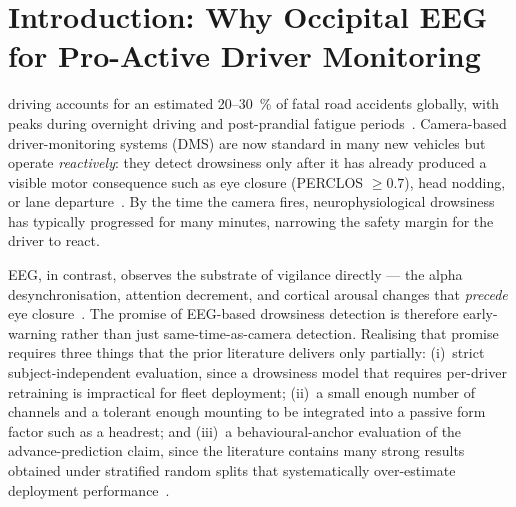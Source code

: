 \documentclass[journal]{IEEEtran}
\DeclareRobustCommand{\add}[1]{#1}                         %
\DeclareRobustCommand{\del}[1]{}                           %
\DeclareRobustCommand{\add}[1]{\hl{#1}}
\DeclareRobustCommand{\del}[1]{{\color{delred}\sout{#1}}\,}
\DeclareRobustCommand{\del}[1]{}                         %
\DeclareRobustCommand{\chg}[2]{\del{#1}\add{#2}}
\begin{document}
\section{\chg{Introduction}{Introduction: Why Occipital EEG for Pro-Active Driver Monitoring}}
\label{sec:intro}
 driving accounts for an estimated 20--30~\% of fatal road accidents globally, with peaks during overnight driving and post-prandial fatigue periods~\cite{who2023road}. Camera-based driver-monitoring systems (DMS) are now standard in many new vehicles but operate \emph{reactively}: they detect drowsiness only after it has already produced a visible motor consequence such as eye closure (PERCLOS \(\geq 0.7\)), head nodding, or lane departure~\cite{seeingmachines2024}. By the time the camera fires, neurophysiological drowsiness has typically progressed for many minutes, narrowing the safety margin for the driver to react.

EEG, in contrast, observes the substrate of vigilance directly --- the alpha desynchronisation, attention decrement, and cortical arousal changes that \emph{precede} eye closure~\cite{jap2009eeg,stancin2021review}. The promise of EEG-based drowsiness detection is therefore early-warning rather than just same-time-as-camera detection. Realising that promise requires three things that the prior literature delivers only partially: (i)~strict subject-independent evaluation, since a drowsiness model that requires per-driver retraining is impractical for fleet deployment; (ii)~a small enough number of channels and a tolerant enough mounting to be integrated into a passive form factor such as a headrest; and (iii)~a behavioural-anchor evaluation of the advance-prediction claim, since the literature contains many strong results obtained under stratified random splits that systematically over-estimate deployment performance~\cite{balam2024review}.
\end{document}
